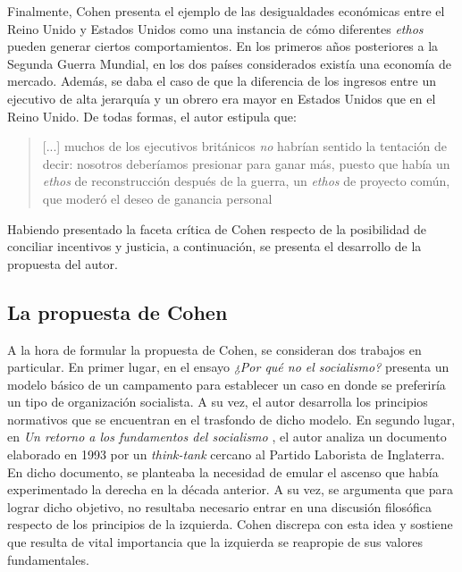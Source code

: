 Finalmente, Cohen presenta el ejemplo de las desigualdades económicas entre el Reino Unido y Estados Unidos como una instancia de cómo diferentes \textit{ethos} pueden generar ciertos comportamientos. En los primeros años posteriores a la Segunda Guerra Mundial, en los dos países considerados existía una economía de mercado. Además, se daba el caso de que la diferencia de los ingresos entre un ejecutivo de alta jerarquía y un obrero era mayor en Estados Unidos que en el Reino Unido. De todas formas, el autor estipula que:

\vspace{3mm}
\begin{quote}
    [...] muchos de los ejecutivos británicos \textit{no} habrían sentido la tentación de decir: nosotros deberíamos presionar para ganar más, puesto que había un \textit{ethos} de reconstrucción después de la guerra, un \textit{ethos} de proyecto común, que moderó el deseo de ganancia personal \citep[p. 195]{Cohen_2001}
\end{quote}
\vspace{3mm}

Habiendo presentado la faceta crítica de Cohen respecto de la posibilidad de conciliar incentivos y justicia, a continuación, se presenta el desarrollo de la propuesta del autor.


\subsection{La propuesta de Cohen}

A la hora de formular la propuesta de Cohen, se consideran dos trabajos en particular. En primer lugar, en el ensayo \textit{¿Por qué no el socialismo?} \citet{Cohen_2014c} presenta un modelo básico de un campamento para establecer un caso en donde se preferiría un tipo de organización socialista. A su vez, el autor desarrolla los principios normativos que se encuentran en el trasfondo de dicho modelo. En segundo lugar, en \textit{Un retorno a los fundamentos del socialismo} \citep{Cohen_2014b}, el autor analiza un documento elaborado en 1993 por un \textit{think-tank} cercano al Partido Laborista de Inglaterra. En dicho documento, se planteaba la necesidad de emular el ascenso que había experimentado la derecha en la década anterior. A su vez, se argumenta que para lograr dicho objetivo, no resultaba necesario entrar en una discusión filosófica respecto de los principios de la izquierda. Cohen discrepa con esta idea y sostiene que resulta de vital importancia que la izquierda se reapropie de sus valores fundamentales.

